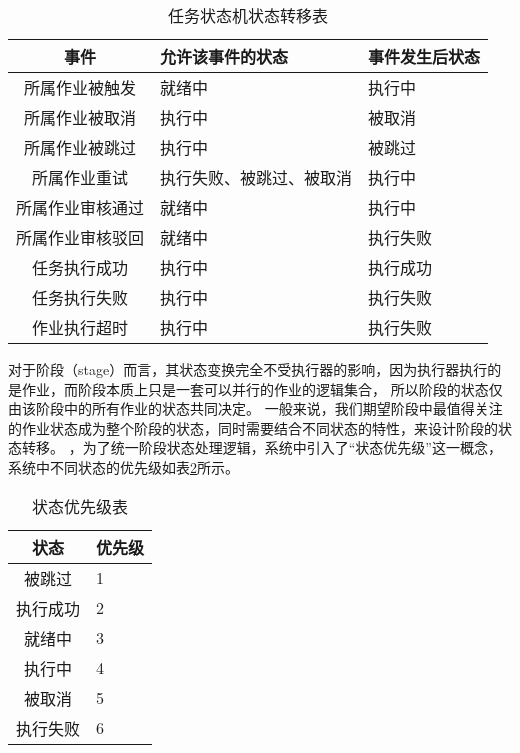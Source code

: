 \begin{table}[h]
  \centering
  \caption{任务状态机状态转移表}
  \label{tab:任务状态机状态转移表}
  \begin{tabular}{cll}
    \toprule
    事件           & 允许该事件的状态          & 事件发生后状态                  \\
    \midrule
    所属作业被触发           & 就绪中                   & 执行中       \\
    所属作业被取消           & 执行中                   & 被取消       \\
    所属作业被跳过           & 执行中                   & 被跳过       \\
    所属作业重试            & 执行失败、被跳过、被取消   & 执行中       \\
    所属作业审核通过        & 就绪中                   & 执行中        \\
    所属作业审核驳回        & 就绪中                   & 执行失败       \\
    任务执行成功            & 执行中      & 执行成功   \\
    任务执行失败            & 执行中      & 执行失败   \\
    作业执行超时            & 执行中      & 执行失败   \\
    \bottomrule
  \end{tabular}
\end{table}

对于阶段（stage）而言，其状态变换完全不受执行器的影响，因为执行器执行的是作业，而阶段本质上只是一套可以并行的作业的逻辑集合，
所以阶段的状态仅由该阶段中的所有作业的状态共同决定。
一般来说，我们期望阶段中最值得关注的作业状态成为整个阶段的状态，同时需要结合不同状态的特性，来设计阶段的状态转移。
，为了统一阶段状态处理逻辑，系统中引入了“状态优先级”这一概念，系统中不同状态的优先级如表\ref{tab:状态优先级表}所示。

\begin{table}[h]
  \centering
  \caption{状态优先级表}
  \label{tab:状态优先级表}
  \begin{tabular}{cl}
    \toprule
    状态           & 优先级                                     \\
    \midrule
    被跳过         & 1         \\
    执行成功       & 2         \\
    就绪中         & 3         \\
    执行中         & 4         \\
    被取消         & 5         \\
    执行失败       & 6         \\
    \bottomrule
  \end{tabular}
\end{table}

